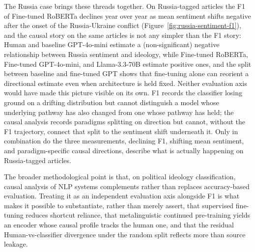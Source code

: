 The Russia case brings these threads together. On Russia-tagged articles the F1 of Fine-tuned RoBERTa declines year over year as mean sentiment shifts negative after the onset of the Russia-Ukraine conflict (Figure~\ref{fig:russia-sentiment-f1}), and the causal story on the same articles is not any simpler than the F1 story: Human and baseline GPT-4o-mini estimate a (non-significant) negative relationship between Russia sentiment and ideology, while Fine-tuned RoBERTa, Fine-tuned GPT-4o-mini, and Llama-3.3-70B estimate positive ones, and the split between baseline and fine-tuned GPT shows that fine-tuning alone can reorient a directional estimate even when architecture is held fixed. Neither evaluation axis would have made this picture visible on its own. F1 records the classifier losing ground on a drifting distribution but cannot distinguish a model whose underlying pathway has also changed from one whose pathway has held; the causal analysis records paradigms splitting on direction but cannot, without the F1 trajectory, connect that split to the sentiment shift underneath it. Only in combination do the three measurements, declining F1, shifting mean sentiment, and paradigm-specific causal directions, describe what is actually happening on Russia-tagged articles.

The broader methodological point is that, on political ideology classification, causal analysis of NLP systems complements rather than replaces accuracy-based evaluation. Treating it as an independent evaluation axis alongside F1 is what makes it possible to substantiate, rather than merely assert, that supervised fine-tuning reduces shortcut reliance, that metalinguistic continued pre-training yields an encoder whose causal profile tracks the human one, and that the residual Human-vs-classifier divergence under the random split reflects more than source leakage.

